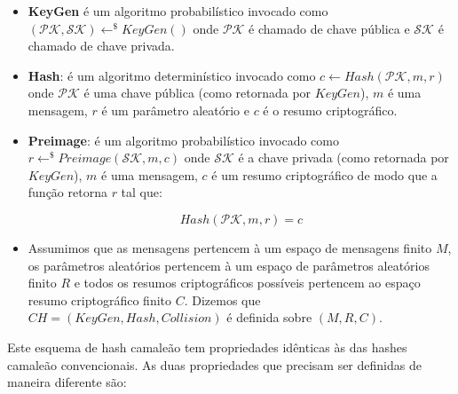 \documentclass[a4paper]{article}
\begin{document}
\begin{itemize}
\item\textbf{KeyGen} é um algoritmo probabilístico invocado como
  $(\mathcal{PK}, \mathcal{SK}) \leftarrow^\$ KeyGen()$ onde
  $\mathcal{PK}$ é chamado de chave pública e $\mathcal{SK}$ é chamado
  de chave privada.
\item\textbf{Hash}: é um algoritmo determinístico invocado como $c
  \leftarrow Hash(\mathcal{PK}, m, r)$ onde $\mathcal{PK}$ é uma chave
  pública (como retornada por $KeyGen$), $m$ é uma mensagem, $r$ é um
  parâmetro aleatório e $c$ é o resumo criptográfico.
\item\textbf{Preimage}: é um algoritmo probabilístico invocado como $r
  \leftarrow^\$ Preimage(\mathcal{SK}, m, c)$ onde $\mathcal{SK}$ é a
  chave privada (como retornada por $KeyGen$), $m$ é uma mensagem, $c$
  é um resumo criptográfico de modo que a função retorna $r$ tal que:

  $$ Hash(\mathcal{PK}, m,r) = c$$
\item Assumimos que as mensagens pertencem à um espaço de mensagens
  finito $M$, os parâmetros aleatórios pertencem à um espaço de
  parâmetros aleatórios finito $R$ e todos os resumos criptográficos
  possíveis pertencem ao espaço resumo criptográfico finito $C$.
  Dizemos que $CH=(KeyGen, Hash, Collision)$ é definida sobre $(M, R,
  C)$.
\end{itemize}

Este esquema de hash camaleão tem propriedades idênticas às das hashes
camaleão convencionais. As duas propriedades que precisam ser
definidas de maneira diferente são:






{}
\end{document}
